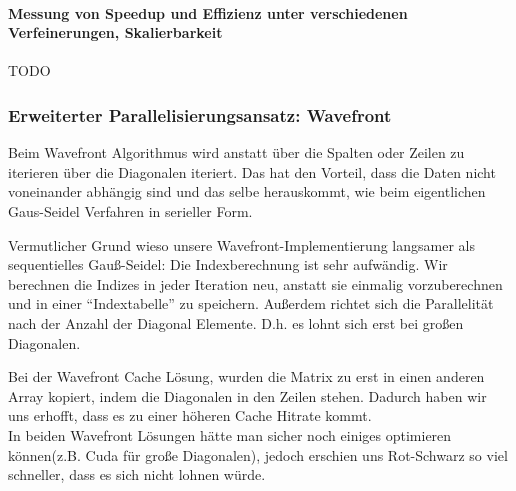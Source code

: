 \documentclass{article}
\begin{document}
\newpage

\paragraph{Messung von Speedup und Effizienz unter verschiedenen Verfeinerungen, Skalierbarkeit}
TODO

\subsubsection{Erweiterter Parallelisierungsansatz: Wavefront}
Beim Wavefront Algorithmus wird anstatt über die  Spalten oder Zeilen zu iterieren über die Diagonalen iteriert. Das hat den Vorteil, dass die Daten nicht voneinander abhängig sind und das selbe herauskommt, wie beim eigentlichen Gaus-Seidel Verfahren in serieller Form.

Vermutlicher Grund wieso unsere Wavefront-Implementierung langsamer als sequentielles Gauß-Seidel: Die Indexberechnung ist sehr aufwändig. Wir berechnen  die Indizes in jeder Iteration neu, anstatt sie einmalig vorzuberechnen und in einer ``Indextabelle'' zu speichern. Außerdem richtet sich die Parallelität nach der Anzahl der Diagonal Elemente. D.h. es lohnt sich erst bei großen Diagonalen.

Bei der Wavefront Cache Lösung, wurden die Matrix zu erst in einen anderen Array kopiert, indem die Diagonalen in den Zeilen stehen. Dadurch haben wir uns erhofft, dass es zu einer höheren Cache Hitrate kommt. \\
In beiden Wavefront Lösungen hätte man sicher noch einiges optimieren können(z.B. Cuda für große Diagonalen), jedoch erschien uns Rot-Schwarz so viel schneller, dass es sich nicht lohnen würde.
\end{document}
